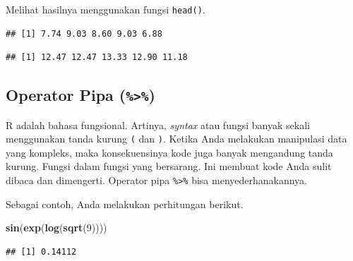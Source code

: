 \documentclass[openany]{book}
\newenvironment{Shaded}{\begin{snugshade}}{\end{snugshade}}
\newcommand{\KeywordTok}[1]{\textcolor[rgb]{0.13,0.29,0.53}{\textbf{#1}}}
\newcommand{\DecValTok}[1]{\textcolor[rgb]{0.00,0.00,0.81}{#1}}
\newcommand{\CommentTok}[1]{\textcolor[rgb]{0.56,0.35,0.01}{\textit{#1}}}
\newcommand{\OperatorTok}[1]{\textcolor[rgb]{0.81,0.36,0.00}{\textbf{#1}}}
\newcommand{\NormalTok}[1]{#1}
\begin{document}
Melihat hasilnya menggunakan fungsi \texttt{head()}.

\begin{Shaded}
\end{Shaded}

\begin{verbatim}
## [1] 7.74 9.03 8.60 9.03 6.88
\end{verbatim}

\begin{Shaded}
\end{Shaded}

\begin{verbatim}
## [1] 12.47 12.47 13.33 12.90 11.18
\end{verbatim}

\subsection{\texorpdfstring{Operator Pipa
(\texttt{\%\textgreater{}\%})}{Operator Pipa (\%\textgreater{}\%)}}\label{operator-pipa}

R adalah bahasa fungsional. Artinya, \emph{syntax} atau fungsi banyak
sekali menggunakan tanda kurung \texttt{(} dan \texttt{)}. Ketika Anda
melakukan manipulasi data yang kompleks, maka konsekuensinya kode juga
banyak mengandung tanda kurung. Fungsi dalam fungsi yang bersarang. Ini
membuat kode Anda sulit dibaca dan dimengerti. Operator pipa
\texttt{\%\textgreater{}\%} bisa menyederhanakannya.

Sebagai contoh, Anda melakukan perhitungan berikut.

\begin{Shaded}
\begin{Highlighting}[]
\KeywordTok{sin}\NormalTok{(}\KeywordTok{exp}\NormalTok{(}\KeywordTok{log}\NormalTok{(}\KeywordTok{sqrt}\NormalTok{(}\DecValTok{9}\NormalTok{))))}
\end{Highlighting}
\end{Shaded}

\begin{verbatim}
## [1] 0.14112
\end{verbatim}
\end{document}
